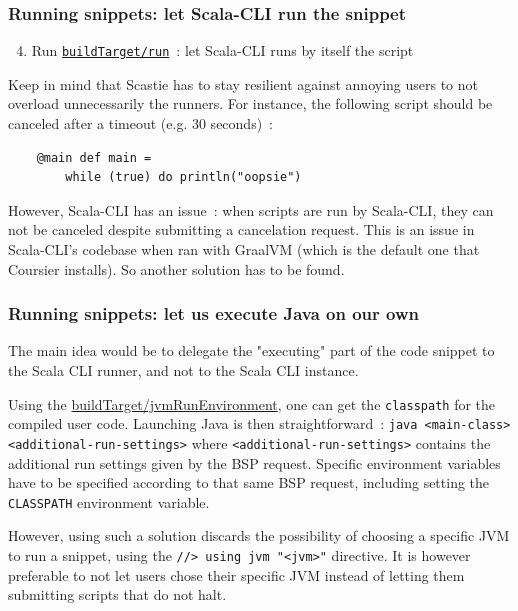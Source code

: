 \documentclass{article}
\begin{document}
\subsubsection{Running snippets: let Scala-CLI run the snippet}

\begin{enumerate}
    \setcounter{enumi}{3}
    \item Run \href{https://build-server-protocol.github.io/docs/specification#compile-request}{\lstinline{buildTarget/run}}~: let Scala-CLI runs by itself the script
\end{enumerate}

Keep in mind that Scastie has to stay resilient against annoying users to not overload unnecessarily the runners. For instance, the following script should be canceled after a timeout (e.g. 30 seconds)~:

\begin{lstlisting}
    @main def main =
        while (true) do println("oopsie")
\end{lstlisting}

However, Scala-CLI has an issue~: when scripts are run by Scala-CLI, they can not be canceled despite submitting a cancelation request. This is an issue in Scala-CLI's codebase when ran with GraalVM (which is the default one that Coursier installs). So another solution has to be found.

\subsubsection{Running snippets: let us execute Java on our own}

The main idea would be to delegate the "executing" part of the code snippet to the Scala CLI runner, and not to the Scala CLI instance.

Using the \href{https://build-server-protocol.github.io/docs/extensions/jvm#run-environment-request}{buildTarget/jvmRunEnvironment}, one can get the \lstinline{classpath} for the compiled user code. Launching Java is then straightforward~: \lstinline{java <main-class> <additional-run-settings>} where \lstinline{<additional-run-settings>} contains the additional run settings given by the BSP request. Specific environment variables have to be specified according to that same BSP request, including setting the \lstinline{CLASSPATH} environment variable.

However, using such a solution discards the possibility of choosing a specific JVM to run a snippet, using the \lstinline{//> using jvm "<jvm>"} directive. It is however preferable to not let users chose their specific JVM instead of letting them submitting scripts that do not halt.
\end{document}
